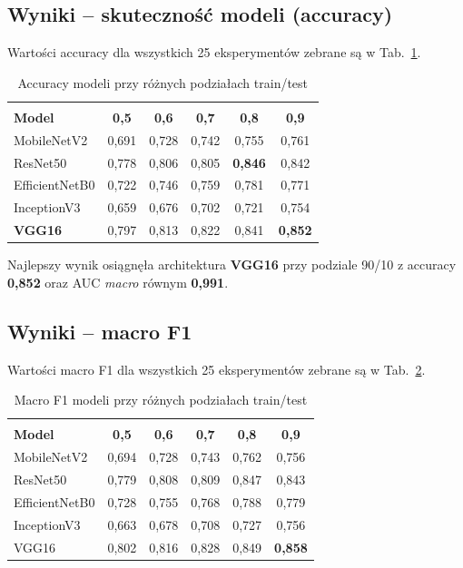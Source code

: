 \documentclass[12pt]{article}
\begin{document}
\subsection{Wyniki -- skuteczność modeli (accuracy)}

Wartości accuracy dla wszystkich 25 eksperymentów zebrane są w Tab.~\ref{tab:accuracy}.

\begin{table}[h!]
  \caption{Accuracy modeli przy różnych podziałach train/test}
  \centering
  \vspace{0.2cm}
  \begin{tabular}{l c c c c c}
    \hline\hline\\[-0.4cm]
    \textbf{Model} & \textbf{0{,}5} & \textbf{0{,}6} & \textbf{0{,}7} & \textbf{0{,}8} & \textbf{0{,}9}\\[0.1cm]
    \hline
    MobileNetV2 & 0{,}691 & 0{,}728 & 0{,}742 & 0{,}755 & 0{,}761\\
    ResNet50 & 0{,}778 & 0{,}806 & 0{,}805 & \textbf{0{,}846} & 0{,}842\\
    EfficientNetB0 & 0{,}722 & 0{,}746 & 0{,}759 & 0{,}781 & 0{,}771\\
    InceptionV3 & 0{,}659 & 0{,}676 & 0{,}702 & 0{,}721 & 0{,}754\\
    \textbf{VGG16} & 0{,}797 & 0{,}813 & 0{,}822 & 0{,}841 & \textbf{0{,}852}\\
    [0.1cm]
    \hline
  \end{tabular}
  \label{tab:accuracy}
\end{table}

Najlepszy wynik osiągnęła architektura {\bf VGG16} przy podziale 90/10 z accuracy {\bf 0{,}852} oraz AUC \textit{macro} równym {\bf 0{,}991}.

\subsection{Wyniki -- macro F1}

Wartości macro F1 dla wszystkich 25 eksperymentów zebrane są w Tab.~\ref{tab:f1}.

\begin{table}[H]
  \caption{Macro F1 modeli przy różnych podziałach train/test}
  \centering
  \vspace{0.2cm}
  \begin{tabular}{l c c c c c}
    \hline\hline\\[-0.4cm]
    \textbf{Model} & \textbf{0{,}5} & \textbf{0{,}6} & \textbf{0{,}7} & \textbf{0{,}8} & \textbf{0{,}9}\\[0.1cm]
    \hline
    MobileNetV2 & 0{,}694 & 0{,}728 & 0{,}743 & 0{,}762 & 0{,}756\\
    ResNet50 & 0{,}779 & 0{,}808 & 0{,}809 & 0{,}847 & 0{,}843\\
    EfficientNetB0 & 0{,}728 & 0{,}755 & 0{,}768 & 0{,}788 & 0{,}779\\
    InceptionV3 & 0{,}663 & 0{,}678 & 0{,}708 & 0{,}727 & 0{,}756\\
    VGG16 & 0{,}802 & 0{,}816 & 0{,}828 & 0{,}849 & \textbf{0{,}858}\\
    [0.1cm]
    \hline
  \end{tabular}
  \label{tab:f1}
\end{table}
\end{document}

